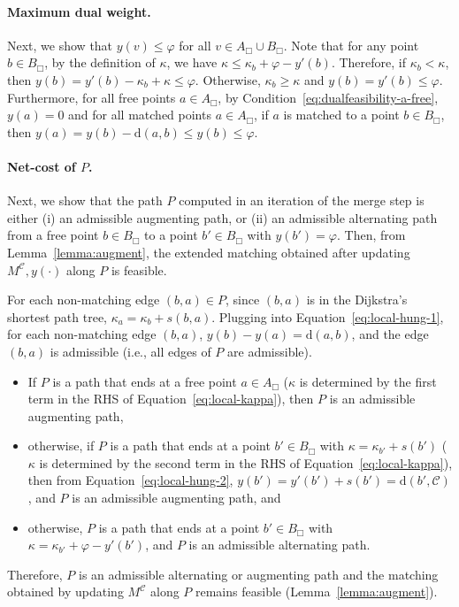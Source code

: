 \documentclass[11pt,onecolumn]{article}
\def\mcC{{\mathcal{C}}}
\newcommand{\cell}{\Box}
\newcommand{\distance}[2]{\mathrm{d}(#1, #2)}
\newcommand{\ymax}{\varphi}
\newcommand\myparagraph[1]{\paragraph{#1}}
\begin{document}
    \myparagraph{Maximum dual weight.} Next, we show that $y(v)\le \ymax$ for all $v\in A_\cell\cup B_\cell$. Note that for any point $b\in B_\cell$, by the definition of $\kappa$, we have $\kappa\le \kappa_b+\ymax-y'(b)$. Therefore, if $\kappa_b<\kappa$, then $y(b) = y'(b)-\kappa_b+\kappa\le \ymax$. Otherwise, $\kappa_b\ge \kappa$ and $y(b)=y'(b)\le \ymax$. Furthermore, for all free points $a\in A_\cell$, by Condition~\eqref{eq:dualfeasibility-a-free}, $y(a)=0$ and for all matched points $a\in A_\cell$, if $a$ is matched to a point $b\in B_\cell$, then $y(a)=y(b)-\distance{a}{b}\le y(b)\le \ymax$.
    


    \myparagraph{Net-cost of $P$.} Next, we show that the path $P$ computed in an iteration of the merge step is either (i) an admissible augmenting path, or (ii) an admissible alternating path from a free point $b\in B_\cell$ to a point $b'\in B_\cell$ with $y(b')=\ymax$. Then, from Lemma~\ref{lemma:augment}, the extended matching obtained after updating $M^\mcC, y(\cdot)$ along $P$ is feasible.
    
    For each non-matching edge $(b,a)\in P$, since $(b,a)$ is in the Dijkstra's shortest path tree, $\kappa_a = \kappa_b + s(b,a)$. Plugging into Equation~\eqref{eq:local-hung-1}, for each non-matching edge $(b,a)$, $y(b)-y(a)=\distance{a}{b}$, and the edge $(b,a)$ is admissible (i.e., all edges of $P$ are admissible).
    \begin{itemize}
        \item If $P$ is a path that ends at a free point $a\in A_\cell$ ($\kappa$ is determined by the first term in the RHS of Equation~\eqref{eq:local-kappa}), then $P$ is an admissible augmenting path, 
        \item otherwise, if $P$ is a path that ends at a point $b'\in B_\cell$ with $\kappa=\kappa_{b'}+s(b')$ ($\kappa$ is determined by the second term in the RHS of Equation~\eqref{eq:local-kappa}), then from Equation~\eqref{eq:local-hung-2}, $y(b') = y'(b')+s(b') = \distance{b'}{\mcC}$, and $P$ is an admissible augmenting path, and
        \item otherwise, $P$ is a path that ends at a point $b'\in B_\cell$ with $\kappa=\kappa_{b'}+\ymax-y'(b')$, and $P$ is an admissible alternating path.
    \end{itemize}
    Therefore, $P$ is an admissible alternating or augmenting path and the matching obtained by updating $M^\mcC$ along $P$ remains feasible (Lemma~\ref{lemma:augment}). 
    
\end{document}
